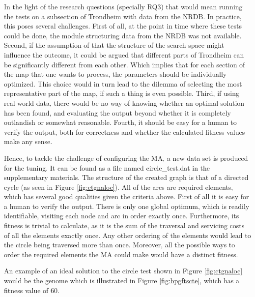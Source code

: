 In the light of the research questions (specially RQ3) that would mean running the tests on a subsection of Trondheim with data from the NRDB. In practice, this poses several challenges. First of all, at the point in time where these tests could be done, the module structuring data from the NRDB was not available. Second, if the assumption of that the structure of the search space might influence the outcome, it could be argued that different parts of Trondheim can be significantly different from each other. Which implies that for each section of the map that one wants to process, the parameters should be individually optimized. This choice would in turn lead to the dilemma of selecting the most representative part of the map, if such a thing is even possible. Third, if using real world data, there would be no way of knowing whether an optimal solution has been found, and evaluating the output beyond whether it is completely outlandish or somewhat reasonable. Fourth, it should be easy for a human to verify the output, both for correctness and whether the calculated fitness values make any sense.

Hence, to tackle the challenge of configuring the MA, a new data set is produced for the tuning. It can be found as a file named circle\_test.dat in the supplementary materials. The structure of the created graph is that of a directed cycle (as seen in Figure \ref{fig:ctgnaloc}). All of the arcs are required elements, which has several good qualities given the criteria above. First of all it is easy for a human to verify the output. There is only one global optimum, which is readily identifiable, visiting each node and arc in order exactly once. Furthermore, its fitness is trivial to calculate, as it is the sum of the traversal and servicing costs of all the elements exactly once. Any other ordering of the elements would lead to the circle being traversed more than once. Moreover, all the possible ways to order the required elements the MA could make would have a distinct fitness.

An example of an ideal solution to the circle test shown in Figure \ref{fig:ctgnaloc} would be the genome which is illustrated in Figure \ref{fig:bpgftscte}, which has a fitness value of 60.

